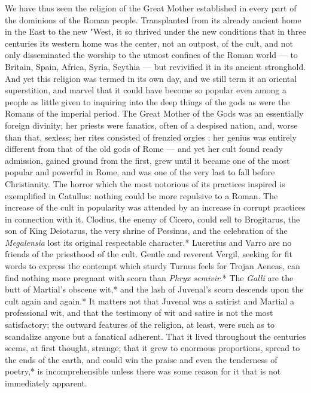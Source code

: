 \documentclass[a4paper, 11pt, oneside, polutonikogreek, english]{article}
\begin{document}
We have thus seen the religion of the Great Mother established in every part of the dominions of the Roman people. Transplanted from its already ancient home in the East to the new "West, it so thrived under the new conditions that in three centuries its western home was the center, not an outpost, of the cult, and not only disseminated the worship to the utmost confines of the Roman world --- to Britain, Spain, Africa, Syria, Scythia --- but revivified it in its ancient stronghold. And yet this religion was termed in its own day, and we still term it an oriental superstition, and marvel that it could have become so popular even among a people as little given to inquiring into the deep things of the gods as were the Romans of the imperial period. The Great Mother of the Gods was an essentially foreign divinity; her priests were fanatics, often of a despised nation, and, worse than that, sexless; her rites consisted of frenzied orgies ; her genius was entirely different from that of the old gods of Rome --- and yet her cult found ready admission, gained ground from the first, grew until it became one of the most popular and powerful in Rome, and was one of the very last to fall before Christianity. The horror which the most notorious of its practices inspired is exemplified in Catullus: nothing could be more repulsive to a Roman. The increase of the cult in popularity was attended by an increase in corrupt practices in connection with it. Clodius, the enemy of Cicero, could sell to Brogitarus, the son of King Deiotarus, the very shrine of Pessinus, and the celebration of the \emph{Megalensia} lost its original respectable character.* Lucretius and Varro are no friends of the priesthood of the cult. Gentle and reverent Vergil, seeking for fit words to express the contempt which sturdy Turnus feels for Trojan Aeneas, can find nothing more pregnant with scorn than \emph{Phryx semivir}.* The \emph{Galli} are the butt of Martial's obscene wit,* and the lash of Juvenal's scorn descends upon the cult again and again.* It matters not that Juvenal was a satirist and Martial a professional wit, and that the testimony of wit and satire is not the most satisfactory; the outward features of the religion, at least, were such as to scandalize anyone but a fanatical adherent. That it lived throughout the centuries seems, at first thought, strange; that it grew to enormous proportions, spread to the ends of the earth, and could win the praise and even the tenderness of poetry,* is incomprehensible unless there was some reason for it that is not immediately apparent.
\end{document}
